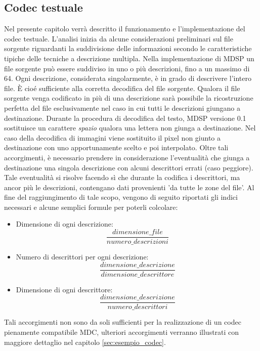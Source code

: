 \subsection{Codec testuale}
\label{cap:implementazione_codec}
Nel presente capitolo verrà descritto il funzionamento e l'implementazione
del codec testuale. L'analisi inizia da alcune considerazioni preliminari sul
file sorgente riguardanti la suddivisione delle informazioni secondo le
caratteristiche tipiche delle tecniche a descrizione multipla. Nella
implementazione di MDSP un file sorgente può essere suddiviso in uno o più
descrizioni, fino a un massimo di 64. Ogni descrizione, considerata
singolarmente, è in grado di descrivere l'intero file. \`E cioé sufficiente
alla corretta decodifica del file sorgente. Qualora il file sorgente venga
codificato in più di una descrizione sarà possibile la ricostruzione
perfetta del file esclusivamente nel caso in cui tutti le descrizioni giungano
a destinazione. Durante la procedura di decodifica del testo, MDSP versione 0.1
sostituisce un carattere \emph{spazio} qualora una lettera non giunga a
destinazione. Nel caso della decodifica di immagini viene sostituito il
pixel non giunto a destinazione con uno apportunamente scelto e
poi interpolato. Oltre tali accorgimenti, è necessario prendere in
considerazione l'eventualità che giunga a destinazione una singola descrizione
con alcuni descrittori errati (caso peggiore). Tale eventualità si risolve
facendo sì che durante la codifica i descrittori, ma ancor più le descrizioni,
contengano dati provenienti 'da tutte le zone del file'. Al fine del
raggiungimento di tale scopo, vengono di seguito riportati gli indici necessari
e alcune semplici formule per poterli colcolare:
\begin{itemize}
 \item Dimensione di ogni descrizione: $$\frac{dimensione\_file}{numero\_descrizioni}$$
 \item Numero di descrittori per ogni descrizione: $$\frac{dimensione\_descrizione}{dimensione\_descrittore}$$
 \item Dimensione di ogni descrittore: $$\frac{dimensione\_descrizione}{numero\_descrittori}$$
\end{itemize}
Tali accorgimenti non sono da soli sufficienti per la realizzazione di un codec
pienamente compatibile MDC, ulteriori accorgimenti verranno illustrati con
maggiore dettaglio nel capitolo \ref{sec:esempio_codec}.

